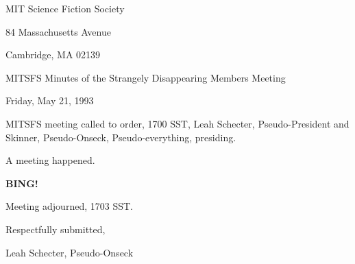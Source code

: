 \documentclass[12pt]{article}
\newcommand{\bing}{{\bf BING!} }
\begin{document}
\begin{center}

MIT Science Fiction Society 

84 Massachusetts Avenue

Cambridge, MA 02139

\vspace{12pt}

MITSFS Minutes of the Strangely Disappearing Members Meeting 

Friday, May 21, 1993

\end{center}
 
\vspace{18pt}

\setlength{\parskip}{6pt}

\noindent
MITSFS meeting called to order, 1700 SST,
Leah Schecter, Pseudo-President and Skinner, Pseudo-Onseck, Pseudo-everything, presiding.

A meeting happened.

\bing

\vspace{12pt}

\noindent
Meeting adjourned, 1703 SST.

\vspace{18pt}

\centerline{Respectfully submitted,}
\centerline{Leah Schecter, Pseudo-Onseck}
\end{document}
